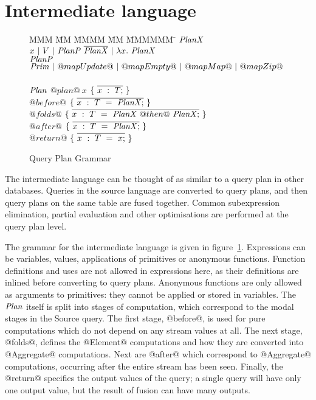 \clearpage
\section{Intermediate language}
\label{s:IcicleCore}

\begin{figure}

\begin{tabbing}
MMM \= MM \= MMMM \= MM \= MMMMMM \= \kill
$\mathit{PlanX}$
\GrammarDef
  $x~|~V~|~\mathit{PlanP}~\overline{\mathit{PlanX}}~|~\lambda{}x.~\mathit{PlanX}$
\\
$\mathit{PlanP}$
\GrammarDef
  $\mathit{Prim}~|~@mapUpdate@~|~@mapEmpty@~|~@mapMap@~|~@mapZip@$
\\
\\
$\mathit{Plan}$
\GrammarDef
  $@plan@~x$ \> $\{~\overline{x~:~T;}~\}$
\\
  \> \> $@before@$ \> $\{~\overline{x~:~T~=~\mathit{PlanX};}~\}$ \\
  \> \> $@folds@$  \> $\{~\overline{x~:~T~=~\mathit{PlanX}~@then@~\mathit{PlanX};}~\}$ \\
  \> \> $@after@$  \> $\{~\overline{x~:~T~=~\mathit{PlanX};}~\}$ \\
  \> \> $@return@$ \> $\{~\overline{x~:~T~=~x;}~\}$ \\
\end{tabbing}



\caption{Query Plan Grammar}
\label{fig:core:grammar}
\end{figure}

The intermediate language can be thought of as similar to a query plan in other databases.
Queries in the source language are converted to query plans, and then query plans on the same table are fused together.
Common subexpression elimination, partial evaluation and other optimisations are performed at the query plan level.

The grammar for the intermediate language is given in figure~\ref{fig:core:grammar}.
Expressions can be variables, values, applications of primitives or anonymous functions.
Function definitions and uses are not allowed in expressions here, as their definitions are inlined before converting to query plans.
Anonymous functions are only allowed as arguments to primitives: they cannot be applied or stored in variables.
The $\mathit{Plan}$ itself is split into stages of computation, which correspond to the modal stages in the Source query.
The first stage, @before@, is used for pure computations which do not depend on any stream values at all.
The next stage, @folds@, defines the @Element@ computations and how they are converted into @Aggregate@ computations.
Next are @after@ which correspond to @Aggregate@ computations, occurring after the entire stream has been seen.
Finally, the @return@ specifies the output values of the query; a single query will have only one output value, but the result of fusion can have many outputs.

